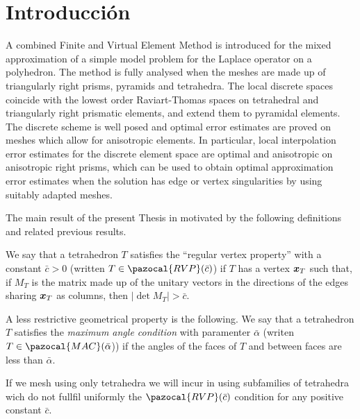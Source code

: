\chapter*{Introducci\'on}
 

A combined Finite and Virtual Element Method is introduced for the 
mixed approximation of a 
simple model problem for the Laplace operator on a polyhedron. The 
method is fully analysed when the meshes are made up of triangularly
right prisms, pyramids and tetrahedra. The local discrete 
spaces coincide with the lowest order Raviart-Thomas 
spaces on tetrahedral and triangularly right prismatic elements, and 
extend them to pyramidal elements. The discrete scheme 
is well posed and optimal error estimates are proved on meshes which 
allow for anisotropic elements. In particular, local 
interpolation error estimates for the discrete element space are 
optimal and anisotropic on anisotropic right prisms, which can be
used to obtain optimal approximation error estimates when the 
solution has edge or vertex singularities by using suitably adapted meshes.   

The main result of the present Thesis in motivated by the following
definitions and related previous results.

We say that a tetrahedron $T$ satisfies the ``regular vertex property'' with a
constant $\bar{c} > 0$ (written $T\in \pazocal{RVP}(\bar c)$) if $T$ has
 a vertex $\boldsymbol{x}_T$ such that,
if $M_T$ is the matrix made up of the unitary vectors in the directions
of the edges sharing $\boldsymbol{x}_T$ as columns, then $|\det M_T| > \bar{c}$.

A less restrictive geometrical property is the following. 
 We say that a tetrahedron $T$ satisfies the  {\it maximum angle condition} with paramenter $\bar\alpha$
(writen $T\in\pazocal{MAC}(\bar\alpha$))  if the angles of the faces of 
$T$ and between faces are 
less than $\bar\alpha$. 

If we mesh using only tetrahedra we will incur in using subfamilies of tetrahedra
wich do not fullfil uniformly the $\pazocal{RVP}(\bar c)$ condition for any positive constant $\bar c$.

